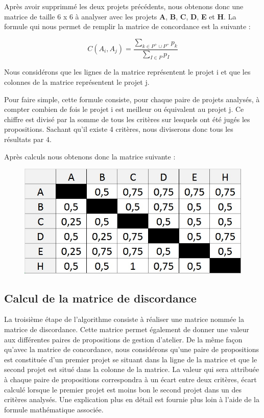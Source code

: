 \documentclass[a4paper,10pt]{article}
\begin{document}
Après avoir supprimmé les deux projets précédents, nous obtenons donc une matrice de taille 6 x 6 à analyser avec les projets \textbf{A}, \textbf{B}, \textbf{C}, \textbf{D}, \textbf{E} et \textbf{H}. La formule qui nous permet de remplir la matrice de concordance est la suivante :

\[
  C(A_i, A_j) = \frac{\sum\limits_{k \in P^+ \cup P^=}{p_k}}{\sum\limits_{I \in P}{p_I}}
\]

Nous considérons que les lignes de la matrice représentent le projet i et que les colonnes de la matrice représentent le projet j.

Pour faire simple, cette formule consiste, pour chaque paire de projets analysés, à compter combien de fois le projet i est meilleur ou équivalent au projet j. Ce chiffre est divisé par la somme de tous les critères sur lesquels ont été jugés les propositions. Sachant qu'il existe 4 critères, nous diviserons donc tous les résultats par 4.


Après calculs nous obtenons donc la matrice suivante :

\begin{figure}[h]
\begin{center}
\includegraphics[scale=0.3]{img/AD_Concordance_neutre.jpg}
\end{center}
\end{figure}

\subsection{Calcul de la matrice de discordance}

La troisième étape de l'algorithme consiste à réaliser une matrice nommée la matrice de discordance. Cette matrice permet également de donner une valeur aux différentes paires de propositions de gestion d'atelier. De la même façon qu'avec la matrice de concordance, nous considérons qu'une paire de propositions est constituée d'un premier projet se situant dans la ligne de la matrice et que le second projet est situé dans la colonne de la matrice. La valeur qui sera attribuée à chaque paire de propositions correspondra à un écart entre deux critères, écart calculé lorsque le premier projet est moins bon le second projet dans un des critères analysés. Une explication plus en détail est fournie plus loin à l'aide de la formule mathématique associée.
\end{document}
